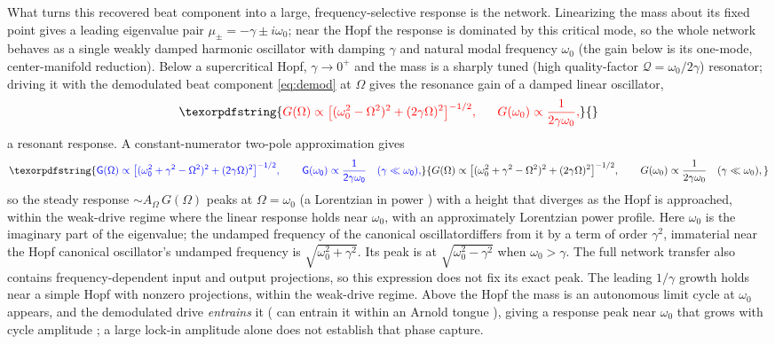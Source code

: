 \documentclass[11pt,a4paper]{article}
\providecommand{\DIFaddtex}[1]{{\protect\color{blue} \sf #1}} %
\providecommand{\DIFdeltex}[1]{{\protect\color{red} \scriptsize #1}} %
\providecommand{\DIFaddbegin}{} %
\providecommand{\DIFaddend}{} %
\providecommand{\DIFdelbegin}{} %
\providecommand{\DIFdelend}{} %
\providecommand{\DIFadd}[1]{\texorpdfstring{\DIFaddtex{#1}}{#1}} %
\providecommand{\DIFdel}[1]{\texorpdfstring{\DIFdeltex{#1}}{}} %
\begin{document}
What turns this recovered beat component into a large, frequency-selective response is
the network. Linearizing the mass about its fixed point gives a leading eigenvalue pair
$\mu_\pm=-\gamma\pm i\omega_0$; near the Hopf the response is dominated by this critical
mode, \DIFdelbegin \DIFdel{so the whole network behaves as a single weakly damped harmonic oscillator }\DIFdelend with damping $\gamma$ and \DIFdelbegin \DIFdel{natural }\DIFdelend \DIFaddbegin \DIFadd{modal }\DIFaddend frequency $\omega_0$\DIFdelbegin \DIFdel{(the gain below is its one-mode,
center-manifold reduction)}\DIFdelend .
Below a supercritical Hopf, $\gamma\to0^+$ and
the mass is a sharply tuned (high quality-factor $\mathcal{Q}=\omega_0/2\gamma$) resonator;
driving it with the demodulated beat component
\eqref{eq:demod} at $\Omega$ gives \DIFdelbegin \DIFdel{the resonance gain of a damped linear oscillator,
}\begin{displaymath}
\DIFdel{G(\Omega)\propto\big[(\omega_0^2-\Omega^2)^2+(2\gamma\Omega)^2\big]^{-1/2},
\qquad G(\omega_0)\propto\frac{1}{2\gamma\omega_0},
}\end{displaymath}%
\DIFdelend \DIFaddbegin \DIFadd{a resonant response. A constant-numerator
two-pole approximation gives
}\begin{equation}
\DIFadd{G(\Omega)\propto\big[(\omega_0^2+\gamma^2-\Omega^2)^2+(2\gamma\Omega)^2\big]^{-1/2},
\qquad G(\omega_0)\propto\frac{1}{2\gamma\omega_0}
\quad(\gamma\ll\omega_0),
\label{eq:gain}
}\end{equation}\DIFaddend
so the \DIFdelbegin \DIFdel{steady }\DIFdelend response $\sim A_\Omega\,G(\Omega)$ peaks \DIFdelbegin \DIFdel{at $\Omega=\omega_0$ (a
Lorentzian in power ) with a height that diverges as the Hopf is approached, within the
weak-drive regime where the linear response holds}\DIFdelend \DIFaddbegin \DIFadd{near $\omega_0$, with an
approximately Lorentzian power profile}\DIFaddend . Here $\omega_0$ is the imaginary part of
the eigenvalue; the \DIFdelbegin \DIFdel{undamped frequency of the canonical oscillatordiffers from it by a
term of order $\gamma^2$, immaterial near the Hopf }\DIFdelend \DIFaddbegin \DIFadd{canonical oscillator's undamped frequency is
$\sqrt{\omega_0^2+\gamma^2}$. Its peak is at $\sqrt{\omega_0^2-\gamma^2}$ when
$\omega_0>\gamma$. The full network transfer also contains frequency-dependent
input and output projections, so this expression does not fix its exact peak.
The leading $1/\gamma$ growth holds near a simple Hopf with nonzero projections,
within the weak-drive regime}\DIFaddend . Above the Hopf \DIFdelbegin \DIFdel{the mass is }\DIFdelend an autonomous limit cycle \DIFdelbegin \DIFdel{at $\omega_0$}\DIFdelend \DIFaddbegin \DIFadd{appears}\DIFaddend ,
and the demodulated drive \DIFdelbegin \DIFdel{\emph{entrains} it (}\DIFdelend \DIFaddbegin \DIFadd{can entrain it within }\DIFaddend an Arnold tongue\DIFdelbegin \DIFdel{), giving a response peak near $\omega_0$ that
grows with cycle amplitude }\DIFdelend \DIFaddbegin \DIFadd{; a large lock-in
amplitude alone does not establish that phase capture}\DIFaddend .
\end{document}
